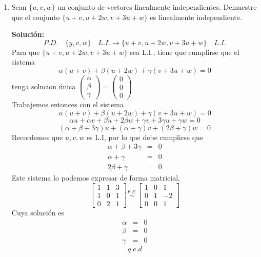 \documentclass[12pt]{article}
\newenvironment{solucion}
{\begin{mdframed}[backgroundcolor=black!10]
		{\bf Solución:}\\
	}
	{
	\end{mdframed}
}
\newenvironment{preguntas}
{\begin{enumerate}\itemsep12pt
	}
	{
	\end{enumerate}
}
\newcommand{\ra}{\rightarrow}
\begin{document}
\begin{preguntas}
\begin{solucion}
	Luego, para que la matriz tenga 2 pivotes, debe ocurrir que
	$$2h-2 = 0 \ra h = 1$$
\end{solucion}
\item Sean $\{u, v, w\}$ un conjunto de vectores linealmente independientes. Demuestre que el conjunto $\{u+v, u+2w, v+3u+w\}$ es linealmente independiente.
\begin{solucion}
$$P.D. \quad \{y, v, w\}\quad L.I. \ra \{u+v, u+2w, v+3u+w\}\quad L.I.$$
		Para que $\{u+v, u+2w, v+3u+w\}$ sea L.I., tiene que cumplirse que el sistema
		$$\alpha(u+v) + \beta(u+2w) + \gamma(v+3u+w) = 0$$
		tenga solucion única $\begin{pmatrix}
		\alpha\\ \beta \\ \gamma
		\end{pmatrix} = \begin{pmatrix} 0\\0\\0\end{pmatrix}$\\
		Trabajemos entonces con el sistema
		$$\alpha(u+v) + \beta(u+2w) + \gamma(v+3u+w) = 0$$
		$$\alpha u+ \alpha v + \beta u+2\beta w + \gamma v+3\gamma u+\gamma w = 0$$
		$$(\alpha + \beta + 3 \gamma)u + (\alpha + \gamma)v + (2\beta + \gamma)w = 0$$
		Recordemos que ${u, v, w}$ es L.I, por lo que debe cumplirse que
		$$\begin{array}{rcl}
		\alpha + \beta + 3 \gamma & = & 0\\
		\alpha + \gamma & = & 0\\
		2\beta + \gamma & = & 0
		\end{array}$$
		Este sistema lo podemos expresar de forma matricial,
		$$\begin{bmatrix}
		1 & 1 & 3\\
		1 & 0 & 1 \\
		0 & 2 & 1
		\end{bmatrix} \stackrel{F.E.}{\sim} \begin{bmatrix}
		1 & 0 & 1\\
		0 & 1 & -2\\
		0 & 0 & 1
		\end{bmatrix}$$
		Cuya solución es
		$$\begin{array}{rcl}
		\alpha & = & 0\\
		\beta & = & 0\\
		\gamma & = & 0
		\end{array}$$
		$$q.e.d$$
	

\end{solucion}
\end{preguntas}
\end{document}
